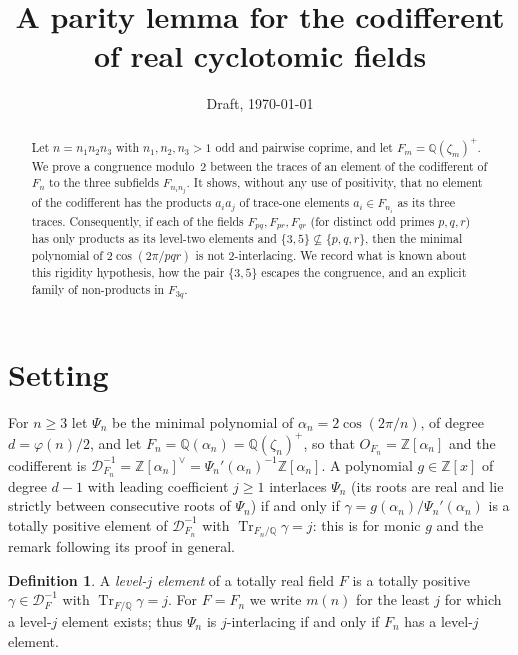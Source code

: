 \documentclass[11pt]{amsart}
\title{A parity lemma for the codifferent of real cyclotomic fields}
\date{Draft, \today}
\newcommand{\Q}{\mathbb{Q}}
\newcommand{\Z}{\mathbb{Z}}
\newcommand{\cod}[1]{\mathcal{D}_{#1}^{-1}}
\DeclareMathOperator{\Tr}{Tr}
\theoremstyle{plain}
\theoremstyle{definition}
\newtheorem{definition}[theorem]{Definition}
\begin{document}
\begin{abstract}
Let $n = n_1 n_2 n_3$ with $n_1, n_2, n_3 > 1$ odd and pairwise coprime, and let
$F_m = \Q(\zeta_m)^+$. We prove a congruence modulo~$2$ between the traces of an element of
the codifferent of $F_n$ to the three subfields $F_{n_i n_j}$. It shows, without any use of
positivity, that no element of the codifferent has the products $a_i a_j$ of trace-one
elements $a_i \in F_{n_i}$ as its three traces. Consequently, if each of the fields
$F_{pq}, F_{pr}, F_{qr}$ (for distinct odd primes $p, q, r$) has only products as its
level-two elements and $\{3,5\} \not\subseteq \{p,q,r\}$, then the minimal polynomial of
$2\cos(2\pi/pqr)$ is not $2$-interlacing.
We record what is known about this rigidity hypothesis, how the pair $\{3,5\}$ escapes the
congruence, and an explicit family of non-products in $F_{3q}$.
\end{abstract}

\maketitle

\section{Setting}\label{sec:setting}

For $n \geq 3$ let $\Psi_n$ be the minimal polynomial of $\alpha_n = 2\cos(2\pi/n)$, of degree
$d = \varphi(n)/2$, and let $F_n = \Q(\alpha_n) = \Q(\zeta_n)^+$, so that $O_{F_n} = \Z[\alpha_n]$
and the codifferent is $\cod{F_n} = \Z[\alpha_n]^\vee = \Psi_n'(\alpha_n)^{-1}\Z[\alpha_n]$.
A polynomial $g \in \Z[x]$ of degree $d-1$ with leading coefficient $j \geq 1$ interlaces
$\Psi_n$ (its roots are real and lie strictly between consecutive roots of $\Psi_n$) if and only
if $\gamma = g(\alpha_n)/\Psi_n'(\alpha_n)$ is a totally positive element
of $\cod{F_n}$ with $\Tr_{F_n/\Q}\gamma = j$: this is \cite[Prop.~3.5]{Y} for monic $g$ and the
remark following its proof in general.

\begin{definition}\label{def:level}
A \emph{level-$j$ element} of a totally real field $F$ is a totally positive
$\gamma \in \cod{F}$ with $\Tr_{F/\Q}\gamma = j$. For $F = F_n$ we write $m(n)$ for the least
$j$ for which a level-$j$ element exists; thus $\Psi_n$ is $j$-interlacing if and only if
$F_n$ has a level-$j$ element.
\end{definition}
\end{document}
